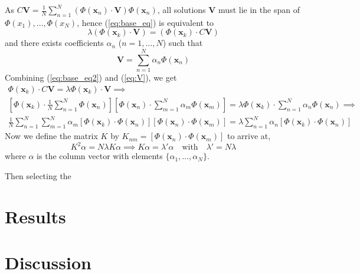 \documentclass[12pt]{article}
\newcommand{\V}{\mathbf{V}}
\newcommand{\x}{\mathbf{x}}
\begin{document}
As $C\V = \frac{1}{N}\sum_{n=1}^{N}(\Phi(\x_n)\cdot\V)\Phi(\x_n)$, all
solutions $\V$ must lie in the span of $\Phi(x_1),\dots,\Phi(x_N)$, hence
(\ref{eq:base_eq}) is equivalent to
\begin{equation}
    \lambda(\Phi(\x_k) \cdot \V) = (\Phi(\x_k) \cdot C\V) \label{eq:base_eq2}
\end{equation}
and there exists coefficients $\alpha_n$ ($n=1,\dots, N$) such that
\begin{equation}
    \V = \sum_{n=1}^{N}\alpha_n\Phi(\x_n) \label{eq:V}
\end{equation}
Combining (\ref{eq:base_eq2}) and (\ref{eq:V}), we get
\begin{gather*}
    \Phi(\x_k) \cdot C \V = \lambda \Phi(\x_k) \cdot \V \implies\\ 
    [\Phi(\x_k) \cdot \frac{1}{N}\sum_{n=1}^{N}\Phi(\x_n)][\Phi(\x_n) \cdot \sum_{m=1}^{N}\alpha_m\Phi(\x_m)] = \lambda \Phi(\x_k) \cdot \sum_{n=1}^{N}\alpha_n \Phi(\x_n) \implies\\
     \frac{1}{N}\sum_{n=1}^{N}\sum_{m=1}^{N}\alpha_m[\Phi(\x_k) \cdot \Phi(\x_n)][\Phi(\x_n) \cdot \Phi(\x_m)] = \lambda \sum_{n=1}^{N}\alpha_n [\Phi(\x_k) \cdot \Phi(\x_n)]
\end{gather*}
Now we define the matrix $K$ by $K_{nm} = [\Phi(\x_n) \cdot \Phi(\x_m)]$ to arrive at,
\begin{equation}
    K^2 \alpha=N \lambda K \alpha \implies K \alpha = \lambda'\alpha \quad\text{with}\quad \lambda' = N \lambda
\end{equation}
where $\alpha$ is the column vector with elements $\{\alpha_1, \dots, \alpha_N\}$.

Then selecting the
\section{Results}

\section{Discussion}


\newpage


\end{document}
